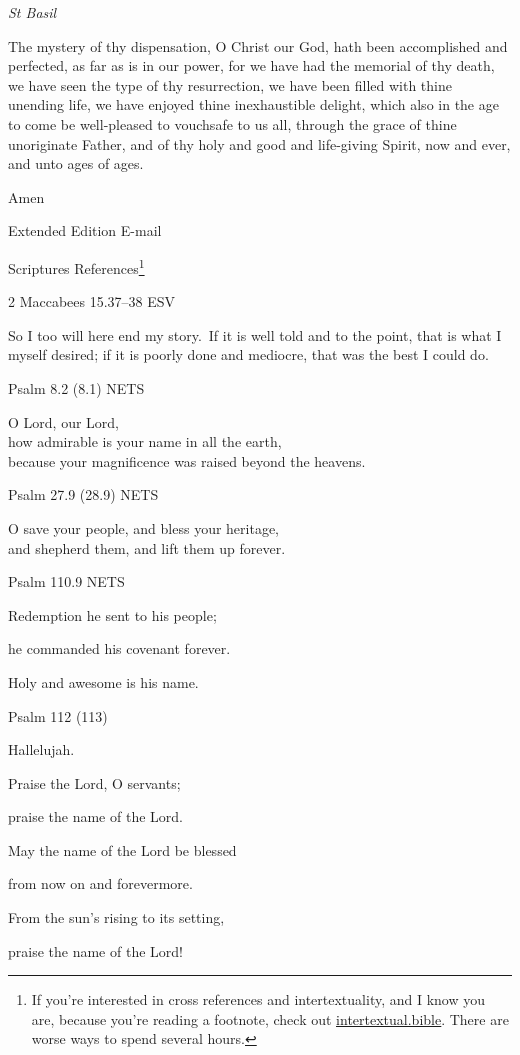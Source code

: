 \documentclass[
]{article}
\newcommand{\RL}[1]{\beginR #1\endR}
\begin{document}
\emph{St Basil}

The mystery of thy dispensation, O Christ our God, hath been
accomplished and perfected, as far as is in our power, for we have had
the memorial of thy death, we have seen the type of thy resurrection, we
have been filled with thine unending life, we have enjoyed thine
inexhaustible delight, which also in the age to come be well-pleased to
vouchsafe to us all, through the grace of thine unoriginate Father, and
of thy holy and good and life-giving Spirit, now and ever, and unto ages
of ages.

Amen

Extended Edition E-mail

Scriptures References\footnote{If you're interested in cross references
  and intertextuality, and I know you are, because you're reading a
  footnote, check out
  \href{http://intertextual.bible}{\ul{intertextual.bible}}. There are
  worse ways to spend several hours.}

2 Maccabees 15.37--38 ESV

So I too will here end my story.~If it is well told and to the point,
that is what I myself desired; if it is poorly done and mediocre, that
was the best I could do.

Psalm 8.2 (8.1) NETS

O Lord, our Lord,\\
how admirable is your name in all the earth,\\
because your magnificence was raised beyond the heavens.

Psalm 27.9 (28.9) NETS

O save your people, and bless your heritage,\\
and shepherd them, and lift them up forever.

Psalm 110.9 NETS

Redemption he sent to his people;

he commanded his covenant forever.

Holy and awesome is his name.

Psalm 112 (113)

Hallelujah.

Praise the Lord, O servants;

praise the name of the Lord.

May the name of the Lord be blessed

from now on and forevermore.

From the sun\RL{'}s rising to its setting,

praise the name of the Lord!
\end{document}
